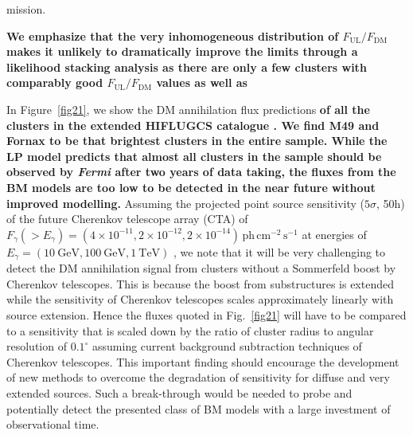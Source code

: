 \documentclass[10pt,aps,pra,reprint,amsmath,amsfonts,amssymb,showpacs,nofootinbib,floatfix]{revtex4-1}
\def\del#1{{}}
\def\C#1{{\bf #1}}
\newcommand{\Fermi}{{\em Fermi}\xspace}
\newcommand{\rmn}{\mathrm}
\begin{document}
mission. \C{We emphasize that the very inhomogeneous distribution of
  $F_{\mathrm{UL}} / F_{\mathrm{DM}}$ makes it unlikely to
  dramatically improve the limits through a likelihood stacking
  analysis as there are only a few clusters with comparably good
  $F_{\mathrm{UL}}/F_{\mathrm{DM}}$ values as well as 

In Figure~\ref{fig21}, we show the DM annihilation flux predictions
\del{of the entire sample}\C{of all the clusters in the extended
  HIFLUGCS catalogue \cite{2007A&A...466..805C}. We find M49 and
  Fornax to be that brightest clusters in the entire sample. While the
  LP model predicts that almost all clusters in the sample should be
  observed by \Fermi after two years of data taking, the fluxes from
  the BM models are too low to be detected in the near future without
  improved modelling.} Assuming the projected point source
sensitivity ($5\sigma$, 50h) of the future Cherenkov telescope array
(CTA) of $F_\gamma(>E_\gamma) = (4\times10^{-11}, 2\times10^{-12},
2\times10^{-14})\,\rmn{ph}\,\rmn{cm}^{-2}\,\rmn{s}^{-1}$ at energies
of $E_\gamma=(10~\rmn{GeV}, 100~\rmn{GeV}, 1~\rmn{TeV})$
\cite{Doro:2009qs}, we note that it will be very challenging to detect
the DM annihilation signal from clusters without a Sommerfeld boost by
Cherenkov telescopes. This is because the boost from substructures is
extended while the sensitivity of Cherenkov telescopes scales
approximately linearly with source extension. Hence the fluxes quoted
in Fig.~\ref{fig21} will have to be compared to a sensitivity that is
scaled down by the ratio of cluster radius to angular resolution of
$0.1^\circ$ assuming current background subtraction techniques of
Cherenkov telescopes. This important finding should encourage the
development of new methods to overcome the degradation of sensitivity
for diffuse and very extended sources. Such a break-through would be
needed to probe and potentially detect the presented class of BM
models with a large investment of observational time.

}
\end{document}
